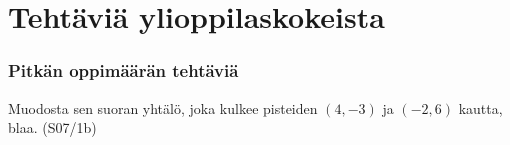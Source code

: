 \section{Tehtäviä ylioppilaskokeista}

\subsubsection*{Pitkän oppimäärän tehtäviä}

\begin{tehtava}
	Muodosta sen suoran yhtälö, joka kulkee pisteiden $(4, -3)$ ja $(-2,6)$ kautta, blaa. (S07/1b)
\end{tehtava}


